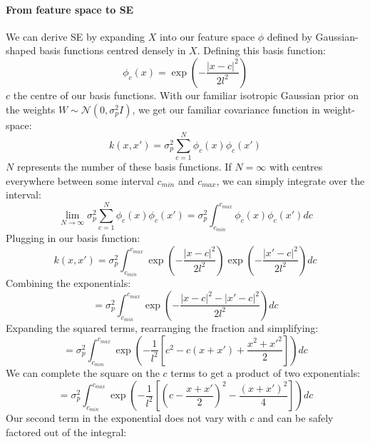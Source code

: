 \paragraph{From feature space to SE}
We can derive SE by expanding $X$ into our feature space $\phi$ defined by Gaussian-shaped basis functions centred densely in $X$. Defining this basis function:
\begin{equation*}
    \phi_c(x) = \exp \left(- \frac{|x - c|^2}{2l^2} \right)
\end{equation*}
$c$ the centre of our basis functions. With our familiar isotropic Gaussian prior on the weights $W \sim \mathcal{N}(0, \sigma^2_pI)$, we get our familiar covariance function in weight-space:
\begin{equation*}
    k(x, x') = \sigma_p^2 \sum_{c=1}^N \phi_c(x) \phi_c(x') 
\end{equation*}
$N$ represents the number of these basis functions. If $N = \infty$ with centres everywhere between some interval $c_{min}$ and $c_{max}$, we can simply integrate over the interval:
\begin{equation*}
    \lim_{N \to \infty} \sigma_p^2 \sum_{c=1}^N \phi_c(x) \phi_c(x') = \sigma_p^2 \int_{c_{min}}^{c_{max}} \phi_c(x) \phi_c(x') dc
\end{equation*}
Plugging in our basis function:
\begin{equation*}
    k(x, x') = \sigma_p^2 \int_{c_{min}}^{c_{max}} \exp \left(- \frac{|x - c|^2}{2l^2} \right) \exp \left(- \frac{|x' - c|^2}{2l^2} \right) dc
\end{equation*}
Combining the exponentials:
\begin{equation*}
    = \sigma_p^2 \int_{c_{min}}^{c_{max}} \exp \left(- \frac{|x - c|^2 - |x' - c|^2}{2l^2} \right) dc
\end{equation*}
Expanding the squared terms, rearranging the fraction and simplifying:
\begin{equation*}
    = \sigma_p^2 \int_{c_{min}}^{c_{max}} \exp \left( -\frac{1}{l^2} \left[ c^2 - c(x + x') + \frac{x^2 + x'^2}{2} \right] \right) dc
\end{equation*}
We can complete the square on the $c$ terms to get a product of two exponentials:
\begin{equation*}
    = \sigma_p^2 \int_{c_{min}}^{c_{max}} \exp \left( -\frac{1}{l^2} \left[ (c - \frac{x + x'}{2})^2 - \frac{(x + x')^2}{4} \right] \right) dc
\end{equation*}
Our second term in the exponential does not vary with $c$ and can be safely factored out of the integral:
